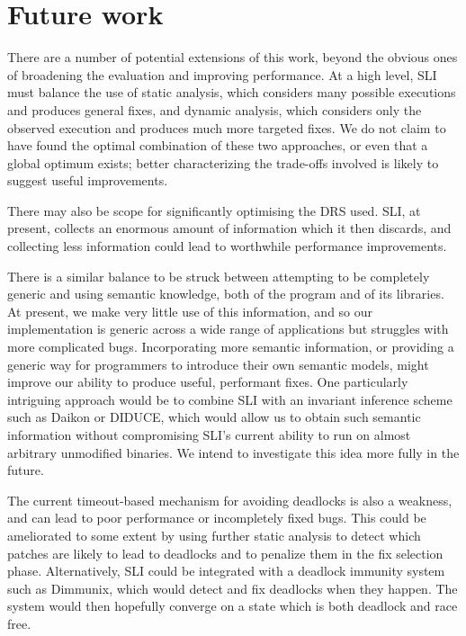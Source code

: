 \documentclass[10pt,twocolumn,preprint,natbib,authoryear]{sigplanconf}
\begin{document}
\section{Future work}

There are a number of potential extensions of this work, beyond the
obvious ones of broadening the evaluation and improving performance.
At a high level, SLI must balance the use of static analysis, which
considers many possible executions and produces general fixes, and
dynamic analysis, which considers only the observed execution and
produces much more targeted fixes.  We do not claim to have found the
optimal combination of these two approaches, or even that a global
optimum exists; better characterizing the trade-offs involved is
likely to suggest useful improvements.

There may also be scope for significantly optimising the DRS used.
SLI, at present, collects an enormous amount of information which it
then discards, and collecting less information could lead to
worthwhile performance improvements.

There is a similar balance to be struck between attempting to be
completely generic and using semantic knowledge, both of the program
and of its libraries.  At present, we make very little use of this
information, and so our implementation is generic across a wide range
of applications but struggles with more complicated bugs.
Incorporating more semantic information, or providing a generic way
for programmers to introduce their own semantic models, might improve
our ability to produce useful, performant fixes.  One particularly
intriguing approach would be to combine SLI with an invariant
inference scheme such as Daikon\cite{Ernst2007} or
DIDUCE\cite{Hangal2002}, which would allow us to obtain such semantic
information without compromising SLI's current ability to run on
almost arbitrary unmodified binaries.  We intend to investigate this
idea more fully in the future.

The current timeout-based mechanism for avoiding deadlocks is also a
weakness, and can lead to poor performance or incompletely fixed bugs.
This could be ameliorated to some extent by using further static
analysis to detect which patches are likely to lead to deadlocks and
to penalize them in the fix selection phase.  Alternatively, SLI could
be integrated with a deadlock immunity system such as
Dimmunix\cite{Jula2008}, which would detect and fix deadlocks when
they happen.  The system would then hopefully converge on a state
which is both deadlock and race free.
\end{document}

